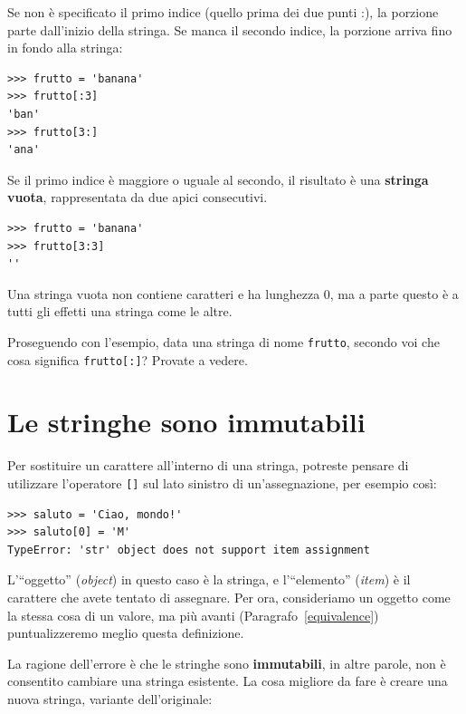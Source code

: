 \documentclass[10pt]{book}
\begin{document}
Se non è specificato il primo indice (quello prima dei due punti :), la porzione parte dall'inizio della stringa. Se manca il secondo indice, la porzione arriva fino in fondo alla stringa:

\begin{verbatim}
>>> frutto = 'banana'
>>> frutto[:3]
'ban'
>>> frutto[3:]
'ana'
\end{verbatim}
%
Se il primo indice è maggiore o uguale al secondo, il risultato è una {\bf stringa vuota}, rappresentata da due apici consecutivi.

\begin{verbatim}
>>> frutto = 'banana'
>>> frutto[3:3]
''
\end{verbatim}
%
Una stringa vuota non contiene caratteri e ha lunghezza 0, ma a parte questo è a tutti gli effetti una stringa come le altre.

Proseguendo con l'esempio, data una stringa di nome {\tt frutto}, secondo voi che cosa significa {\tt frutto[:]}? Provate a vedere.


\section{Le stringhe sono immutabili}

Per sostituire un carattere all'interno di una stringa, potreste pensare di utilizzare l'operatore {\tt []} sul lato sinistro di un'assegnazione, per esempio così:

\begin{verbatim}
>>> saluto = 'Ciao, mondo!'
>>> saluto[0] = 'M'
TypeError: 'str' object does not support item assignment
\end{verbatim}
%
L'``oggetto'' ({\em object}) in questo caso è la stringa, e l'``elemento'' ({\em item}) è il carattere che avete tentato di assegnare. Per ora, consideriamo un  oggetto come la stessa cosa di un valore, ma più avanti (Paragrafo~\ref{equivalence}) puntualizzeremo meglio questa definizione. 

La ragione dell'errore è che le stringhe sono {\bf immutabili}, in altre parole, non è consentito cambiare una stringa esistente. La cosa migliore da fare è creare una nuova stringa, variante dell'originale:
\end{document}
